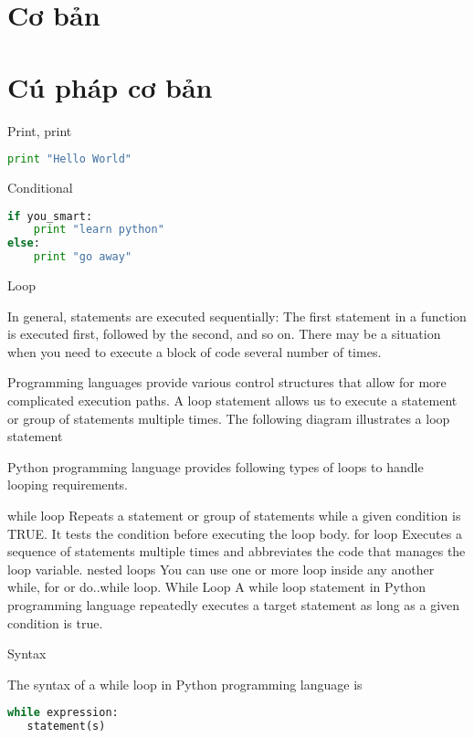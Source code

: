 \section{Cơ bản}

\section{Cú pháp cơ bản}

Print, print

\begin{lstlisting}[language=python]
print "Hello World"
\end{lstlisting}


Conditional

\begin{lstlisting}[language=Python]
if you_smart:
    print "learn python"
else:
    print "go away"
\end{lstlisting}

Loop

In general, statements are executed sequentially: The first statement in a function is executed first, followed by the second, and so on. There may be a situation when you need to execute a block of code several number of times.

Programming languages provide various control structures that allow for more complicated execution paths. A loop statement allows us to execute a statement or group of statements multiple times. The following diagram illustrates a loop statement


Python programming language provides following types of loops to handle looping requirements.

while loop	Repeats a statement or group of statements while a given condition is TRUE. It tests the condition before executing the loop body.
for loop	Executes a sequence of statements multiple times and abbreviates the code that manages the loop variable.
nested loops	You can use one or more loop inside any another while, for or do..while loop.
While Loop
A while loop statement in Python programming language repeatedly executes a target statement as long as a given condition is true.

Syntax

The syntax of a while loop in Python programming language is

\begin{lstlisting}[language=Python]
while expression:
   statement(s)
\end{lstlisting}

